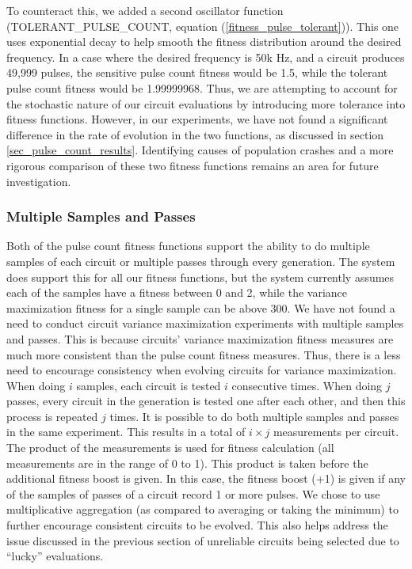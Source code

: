 \documentclass{ieeeaccess}
\begin{document}
To counteract this, we added a second oscillator function (TOLERANT\_PULSE\_COUNT, equation (\ref{fitness_pulse_tolerant})). This one uses exponential decay to help smooth the fitness distribution around the desired frequency. In a case where the desired frequency is 50k Hz, and a circuit produces 49,999 pulses, the sensitive pulse count fitness would be 1.5, while the tolerant pulse count fitness would be 1.99999968.  Thus, we are attempting to account for the stochastic nature of our circuit evaluations by introducing more tolerance into fitness functions. However, in our experiments, we have not found a significant difference in the rate of evolution in the two functions, as discussed in section \ref{sec_pulse_count_results}. Identifying causes of population crashes and a more rigorous comparison of these two fitness functions remains an area for future investigation.








\subsubsection{Multiple Samples and Passes}

Both of the pulse count fitness functions support the ability to do multiple samples of each circuit or multiple passes through every generation. The system does support this for all our fitness functions, but the system currently assumes each of the samples have a fitness between 0 and 2, while the variance maximization fitness for a single sample can be above 300. We have not found a need to conduct circuit variance maximization experiments with multiple samples and passes. This is because circuits' variance maximization fitness measures are much more consistent than the pulse count fitness measures. Thus, there is a less need to encourage consistency when evolving circuits for variance maximization. When doing $i$ samples, each circuit is tested $i$ consecutive times. When doing $j$ passes, every circuit in the generation is tested one after each other, and then this process is repeated $j$ times. It is possible to do both multiple samples and passes in the same experiment. This results in a total of $i \times j$ measurements per circuit. The product of the measurements is used for fitness calculation (all measurements are in the range of 0 to 1). This product is taken before the additional fitness boost is given. In this case, the fitness boost (+1) is given if any of the samples of passes of a circuit record 1 or more pulses. We chose to use multiplicative aggregation (as compared to averaging or taking the minimum) to further encourage consistent circuits to be evolved. This also helps address the issue discussed in the previous section of unreliable circuits being selected due to ``lucky'' evaluations.
\end{document}
